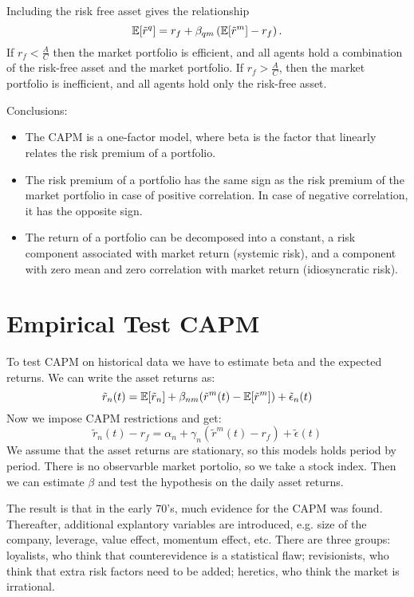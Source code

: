 \documentclass[twoside, titlepage]{article}
\begin{document}
Including the risk free asset gives the relationship
\[
    \mathbb{E}[\tilde{r}^q] = r_f + \beta_{qm}\left(\mathbb{E}[\tilde{r}^m] - r_f\right).
\]
If $r_f < \frac{A}{C}$ then the market portfolio is efficient, and all agents hold a combination of the risk-free asset and the market portfolio. If $r_f > \frac{A}{C}$, then the market portfolio is inefficient, and all agents hold only the risk-free asset.

Conclusions:
\begin{itemize}
    \item The CAPM is a one-factor model, where beta is the factor that linearly relates the risk premium of a portfolio.
    \item The risk premium of a portfolio has the same sign as the risk premium of the market portfolio in case of positive correlation. In case of negative correlation, it has the opposite sign.
    \item The return of a portfolio can be decomposed into a constant, a risk component associated with market return (systemic risk), and a component with zero mean and zero correlation with market return (idiosyncratic risk).
\end{itemize}

\section{Empirical Test CAPM}

To test CAPM on historical data we have to estimate beta and the expected returns. We can write the asset returns as:
\[
    \tilde{r}_n(t) = \mathbb{E}[\tilde{r}_n] +  \beta_{nm}(\tilde{r}^m(t) - \mathbb{E}[\tilde{r}^m]) + \tilde{\epsilon}_n(t)
\]
Now we impose CAPM restrictions and get:
\[
    \tilde{r}_n(t) - r_f = \alpha_n + \gamma_{n}(\tilde{r}^m(t) - r_f) + \tilde{\epsilon}(t)
\]
We assume that the asset returns are stationary, so this models holds period by period. There is no observarble market portolio, so we take a stock index. Then we can estimate $\beta$ and test the hypothesis on the daily asset returns.

The result is that in the early 70's, much evidence for the CAPM was found. Thereafter, additional explantory variables are introduced, e.g. size of the company, leverage, value effect, momentum effect, etc. There are three groups: loyalists, who think that counterevidence is a statistical flaw; revisionists, who think that extra risk factors need to be added; heretics, who think the market is irrational.

\end{document}
